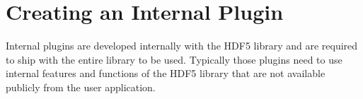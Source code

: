 \section{Creating an Internal Plugin}
Internal plugins are developed internally with the HDF5 library and
are required to ship with the entire library to be used. Typically
those plugins need to use internal features and functions of the HDF5
library that are not available publicly from the user application.

